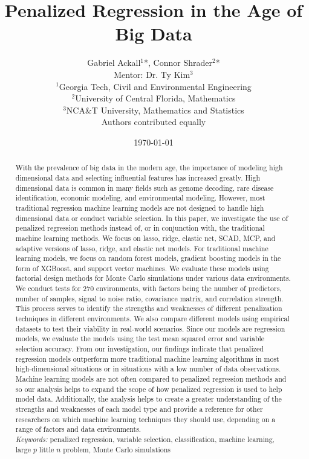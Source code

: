 \documentclass{article}
\title{Penalized Regression in the Age of Big Data} %
\author{Gabriel Ackall$^1$*, Connor Shrader$^2$* \\
		Mentor: Dr. Ty Kim$^3$ \\	
		{\footnotesize $^1$Georgia Tech, Civil and Environmental Engineering} \\
		{\footnotesize $^2$University of Central  Florida, Mathematics} \\
		{\footnotesize $^3$NCA\&T University, Mathematics and Statistics} \\
		{\footnotesize *Authors contributed equally}}
\date{\today}
\begin{document}
\maketitle
\begin{abstract}
	With the prevalence of big data in the modern age, the importance of modeling high dimensional data and selecting influential features has increased greatly. High dimensional data is common in many fields such as genome decoding, rare disease identification, economic modeling, and environmental modeling. However, most traditional regression machine learning models are not designed to handle high dimensional data or conduct variable selection. In this paper, we investigate the use of penalized regression methods instead of, or in conjunction with, the traditional machine learning methods. We focus on lasso, ridge, elastic net, SCAD, MCP, and adaptive versions of lasso, ridge, and elastic net models. For traditional machine learning models, we focus on random forest models, gradient boosting models in the form of XGBoost, and support vector machines. We evaluate these models using factorial design methods for Monte Carlo simulations under various data environments. We conduct tests for 270 environments, with factors being the number of predictors, number of samples, signal to noise ratio, covariance matrix, and correlation strength. This process serves to identify the strengths and weaknesses of different penalization techniques in different environments. We also compare different models using empirical datasets to test their viability in real-world scenarios. Since our models are regression models, we evaluate the models using the test mean squared error and variable selection accuracy. From our investigation, our findings indicate that penalized regression models outperform more traditional machine learning algorithms in most high-dimensional situations or in situations with a low number of data observations. Machine learning models are not often compared to penalized regression methods and so our analysis helps to expand the scope of how penalized regression is used to help model data. Additionally, the analysis helps to create a greater understanding of the strengths and weaknesses of each model type and provide a reference for other researchers on which machine learning techniques they should use, depending on a range of factors and data environments. \\
	
	\textit{Keywords:} penalized regression, variable selection, classification, machine learning, large $p$ little $n$ problem, Monte Carlo simulations
\end{abstract}
\end{document}
